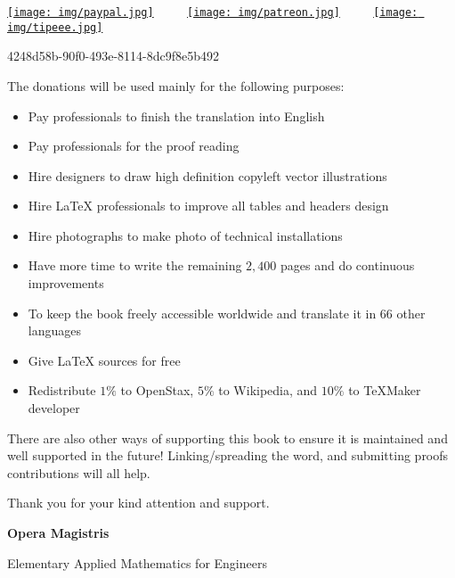 \documentclass[12pt,a4paper,twoside,openright]{report}
\newcounter{def}
\theoremstyle{definition}
\theoremstyle{itexmp}
\numberwithin{equation}{section}
\begin{document}
	\begin{center}
	\href{http://www.sciences.ch/htmlfr/donate.php}{\texttt{[image: img/paypal.jpg]}} $\qquad$ \href{https://www.patreon.com/sciences}{\texttt{[image: img/patreon.jpg]}} $\qquad$ \href{https://www.tipeee.com/elements-of-applied-mathematics}{\texttt{[image: img/tipeee.jpg]}}
	\end{center}
	\begin{center}
		{\large \faBitcoin} 4248d58b-90f0-493e-8114-8dc9f8e5b492
	\end{center}
	The donations will be used mainly for the following purposes:
	\begin{itemize}
		\item Pay professionals to finish the translation into English
		\item Pay professionals for the proof reading
		\item Hire designers to draw high definition copyleft vector illustrations
		\item Hire \LaTeX{} professionals to improve all tables and headers design
		\item Hire photographs to make photo of technical installations
		\item Have more time to write the remaining $2,400$ pages and do continuous improvements
		\item To keep the book freely accessible worldwide and translate it in $66$ other languages
		\item Give \LaTeX{} sources for free
		\item Redistribute $1\%$ to OpenStax, $5\%$ to Wikipedia, and $10\%$ to TeXMaker developer
	\end{itemize}
	There are also other ways of supporting this book to ensure it is maintained and well supported in the future! Linking/spreading the word, and submitting proofs contributions will all help.
	
	Thank you for your kind attention and support.
	
	\newpage\null\thispagestyle{empty}\newpage %
	\pagestyle{empty}
	\pagecolor{gray}
	{\Huge \textbf{Opera Magistris}}
	
	{\LARGE Elementary Applied Mathematics for Engineers}
\end{document}
